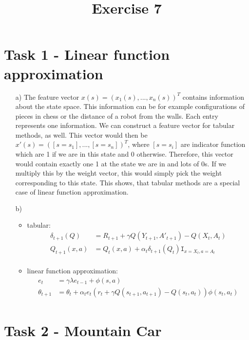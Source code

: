 \documentclass[a4paper]{article}
\date{}
\author{}
\title{\textbf{Exercise 7}}
\begin{document}
\maketitle 
\thispagestyle{fancy}

\section*{Task 1 - Linear function approximation}

\begin{enumerate}
	\item[a)] The feature vector $x(s) = (x_1(s), ..., x_n(s))^T$ contains information about the state space. 
	This information can be for example configurations of pieces in chess or the distance of a robot from the walls. 
	Each entry represents one information.
	We can construct a feature vector for tabular methods, as well. 
	This vector would then be $x'(s) = ([s = s_1], ..., [s = s_n])^T$, where $[s = s_i]$ are indicator function which are 1 if we are in this state and 0 otherwise. 
	Therefore, this vector would contain exactly one 1 at the state we are in and lots of 0s. 
	If we multiply this by the weight vector, this would simply pick the weight corresponding to this state. 
	This shows, that tabular methods are a special case of linear function approximation.
	
	\item[b)] 
	\begin{itemize}
		\item tabular:
		\begin{align*}
				\delta_{t+1}(Q) &= R_{t+1} + \gamma Q(Y_{t+1}, A'_{t+1}) - Q(X_t, A_t) \\
				Q_{t+1}(x, a) &= Q_t(x,a) + \alpha_t \delta_{t+1}(Q_t)\mathtt{I}_{x = X_t, a=A_t}\\		
		\end{align*}
		\item linear function approximation: 
		\begin{align*}
			e_t &= \gamma \lambda e_{t-1} + \phi(s, a) \\
			\theta_{t+1} &= \theta_{t} + \alpha_t e_t (r_t + \gamma Q(s_{t+1}, a_{t+1}) - Q(s_t, a_t))\phi(s_t, a_t) \\
		\end{align*}
	\end{itemize}
	
\end{enumerate}


\section*{Task 2 - Mountain Car}
\end{document}
